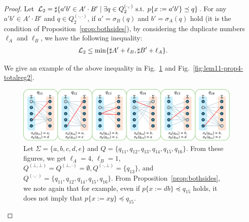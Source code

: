 \begin{proof}
\smallskip

\noindent
Let ${\cal L}_{2} = \sharp\{a'b' \in A'\cdot B' \mid \exists q \in Q_{2}^{(\cdot,\cdot)} \mbox{ s.t. } p\{x:=a'b'\} \preceq q\}$.
For any $a'b' \in A'\cdot B'$ and $q \in Q_{2}^{(\cdot,\cdot)}$, if $a' = \sigma_{B}(q)$ and $b' = \sigma_{A}(q)$ hold (it is the condition of Proposition~\ref{prop:bothsides}), by considering the duplicate numbers $\ell_{A}$ and $\ell_{B}$, we have the following inequality:
\begin{align*}
  {\cal L}_{2} &\leq \min\{\sharp A' + \ell_{B}, \sharp B' + \ell_{A}\}.
\end{align*}

{\color{red}
\noindent
We give an example of the above inequality in Fig.~\ref{fig:lem11-prop4-eachreg2} and Fig.~\ref{fig:lem11-prop4-totalreg2}.}
\begin{figure}[t]
  \begin{center}
    \includegraphics[scale=0.8]{figs/lem11-prop4-eachreg3.png}
    \caption{Let $\Sigma=\{a,b,c,d,e\}$ and $Q=\{q_{11},q_{12},q_{13},q_{14},q_{15},q_{16}\}$. From these figures, we get $\ell_A=4$, $\ell_B=1$, $Q^{(\bot,\bot)}=Q^{(\bot,\cdot)}=\emptyset, Q^{(\cdot,\bot)}=\{q_{13}\}$, and $Q^{(\cdot,\cdot)}=\{q_{11},q_{12},q_{14},q_{15},q_{16}\}$. From Proposition~\ref{prop:bothsides}, we note again that for example, even if $p \{ x:=db \} \preceq q_{15}$ holds, it does not imply that $p \{ x:=xy \} \preceq q_{15}$.}\label{fig:lem11-prop4-eachreg2}
  \end{center}
\end{figure}


\end{proof}
